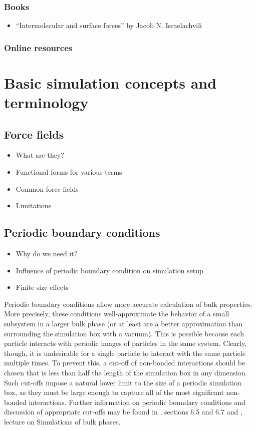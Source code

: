 \documentclass[9pt,bestpractices]{livecoms}
\begin{document}
\subsubsection{Books}
\begin{itemize}
\item “Intermolecular and surface forces” by Jacob N. Israelachvili
\end{itemize}
\subsubsection{Online resources}

\section{Basic simulation concepts and terminology}

\subsection{Force fields}
\begin{itemize}
\item What are they?
\item Functional forms for various terms
\item Common force fields
\item Limitations
\end{itemize}

\subsection{Periodic boundary conditions}
\begin{itemize}
\item Why do we need it?
\item Influence of periodic boundary condition on simulation setup
\item Finite size effects
\end{itemize}


Periodic boundary conditions allow more accurate calculation of bulk properties. 
More precisely, these conditions well-approximate the behavior of a small subsystem in a larger bulk phase (or at least are a better approximation than surrounding the simulation box with a vacuum). 
This is possible because each particle interacts with periodic images of particles in the same system. 
Clearly, though, it is undesirable for a single particle to interact with the same particle multiple times. 
To prevent this, a cut-off of non-bonded interactions should be chosen that is less than half the length of the simulation box in any dimension. 
Such cut-offs impose a natural lower limit to the size of a periodic simulation box, as they must be large enough to capture all of the most significant non-bonded interactions. 
Further information on periodic boundary conditions and discussion of appropriate cut-offs may be found in \citet{LeachBook}, sections 6.5 and 6.7 and \citet{ShellNotes}, lecture on Simulations of bulk phases.
\end{document}
